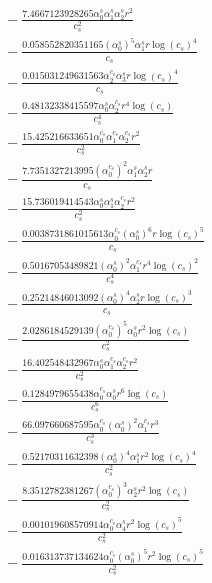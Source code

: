 \documentclass[10pt]{article}
\begin{document}
\begin{align*}
&{}  - \frac{7.4667123928265 \alpha_{0}^s \alpha_{1}^s \alpha_{2}^s r^{2}}{c_{s}^{2}} \\
&{}  - \frac{0.058552820351165 \left(\alpha_{0}^s\right)^{5} \alpha_{1}^s r \log{\left(c_{s} \right)}^{4}}{c_{s}} \\
&{}  - \frac{0.015031249631563 \alpha_{2}^{c_s} \alpha_{3}^s r \log{\left(c_{s} \right)}^{4}}{c_{s}} \\
&{}  - \frac{0.48132338415597 \alpha_{0}^s \alpha_{2}^{c_s} r^{4} \log{\left(c_{s} \right)}}{c_{s}^{4}} \\
&{}  - \frac{15.425216633651 \alpha_{0}^{c_s} \alpha_{1}^{c_s} \alpha_{2}^{c_s} r^{2}}{c_{s}^{2}} \\
&{}  - \frac{7.7351327213995 \left(\alpha_{0}^{c_s}\right)^{2} \alpha_{1}^s \alpha_{2}^s r}{c_{s}} \\
&{}  - \frac{15.736019414543 \alpha_{0}^s \alpha_{1}^s \alpha_{2}^{c_s} r^{2}}{c_{s}^{2}} \\
&{}  - \frac{0.0038731861015613 \alpha_{0}^{c_s} \left(\alpha_{0}^s\right)^{6} r \log{\left(c_{s} \right)}^{5}}{c_{s}} \\
&{}  - \frac{0.50167053489821 \left(\alpha_{0}^s\right)^{2} \alpha_{1}^{c_s} r^{4} \log{\left(c_{s} \right)}^{2}}{c_{s}^{4}} \\
&{}  - \frac{0.25214846013092 \left(\alpha_{0}^s\right)^{4} \alpha_{2}^s r \log{\left(c_{s} \right)}^{3}}{c_{s}} \\
&{}  - \frac{2.0286184529139 \left(\alpha_{0}^{c_s}\right)^{5} \alpha_{0}^s r^{2} \log{\left(c_{s} \right)}}{c_{s}^{2}} \\
&{}  - \frac{16.402548432967 \alpha_{0}^s \alpha_{1}^{c_s} \alpha_{2}^{c_s} r^{2}}{c_{s}^{2}} \\
&{}  - \frac{0.1284979655438 \alpha_{0}^{c_s} \alpha_{0}^s r^{6} \log{\left(c_{s} \right)}}{c_{s}^{6}} \\
&{}  - \frac{66.097660687595 \alpha_{0}^{c_s} \left(\alpha_{0}^s\right)^{2} \alpha_{1}^{c_s} r^{3}}{c_{s}^{3}} \\
&{}  - \frac{0.52170311632398 \left(\alpha_{0}^s\right)^{4} \alpha_{1}^s r^{2} \log{\left(c_{s} \right)}^{4}}{c_{s}^{2}} \\
&{}  - \frac{8.3512782381267 \left(\alpha_{0}^{c_s}\right)^{3} \alpha_{2}^s r^{2} \log{\left(c_{s} \right)}}{c_{s}^{2}} \\
&{}  - \frac{0.001019608570914 \alpha_{0}^{c_s} \alpha_{4}^s r^{2} \log{\left(c_{s} \right)}^{5}}{c_{s}^{2}} \\
&{}  - \frac{0.016313737134624 \alpha_{0}^{c_s} \left(\alpha_{0}^s\right)^{5} r^{2} \log{\left(c_{s} \right)}^{5}}{c_{s}^{2}} \\

\end{align*}
\end{document}
